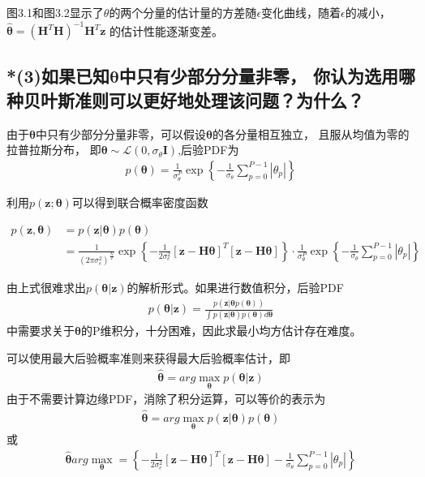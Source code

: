 \documentclass[fontset=windows]{article}
\numberwithin{figure}{section}
\begin{document}
图3.1和图3.2显示了\(\theta\)的两个分量的估计量的方差随\(\epsilon\)变化曲线，随着\(\epsilon\)的减小，
\(\hat{\boldsymbol{\theta}}=(\mathbf{H}^T \mathbf{H})^{-1}\mathbf{H}^T\mathbf{z}\)
的估计性能逐渐变差。

\subsection*{*(3)如果已知\(\boldsymbol{\theta}\)中只有少部分分量非零，
	你认为选用哪种贝叶斯准则可以更好地处理该问题？为什么？}

由于\(\boldsymbol{\theta}\)中只有少部分分量非零，可以假设\(\boldsymbol{\theta}\)的各分量相互独立，
且服从均值为零的拉普拉斯分布，
即\(\boldsymbol{\theta} \sim \mathcal{L}(0,\sigma_{\theta}\mathbf{I})\),后验PDF为
\begin{align*}
	p(\boldsymbol{\theta})=\frac{1}{\sigma_{\theta}^P}
	\exp\left\{-\frac{1}{\sigma_{\theta}}\sum_{p=0}^{P-1}|\theta_p| \right\}
\end{align*}

利用\(p(\mathbf{z};\boldsymbol{\theta})\)可以得到联合概率密度函数

\begin{align*}
	p(\mathbf{z},\boldsymbol{\theta})
	 & =p(\mathbf{z}|\boldsymbol{\theta})p(\boldsymbol{\theta}) \\
	 & =\frac{1}{(2\pi \sigma_e^2)^{\frac{N}{2}}}
	\exp\left\{-\frac{1}{2\sigma_e^2} \left[\mathbf{z-H}\boldsymbol{\theta}\right]^T
	\left[\mathbf{z-H}\boldsymbol{\theta}\right]\right\}\cdot \frac{1}{\sigma_{\theta}^P}
	\exp\left\{-\frac{1}{\sigma_{\theta}}\sum_{p=0}^{P-1}|\theta_p| \right\}
\end{align*}

由上式很难求出\(p(\boldsymbol{\theta}|\mathbf{z})\)的解析形式。如果进行数值积分，后验PDF
\begin{align*}
	p(\boldsymbol{\theta}|\mathbf{z})=\frac{p(\mathbf{z}|\boldsymbol{\theta}p(\boldsymbol{\theta}))}
	{\int p(\mathbf{z|\boldsymbol{\theta}})p(\boldsymbol{\theta})d\boldsymbol{\theta}}
\end{align*}
中需要求关于\(\boldsymbol{\theta}\)的P维积分，十分困难，因此求最小均方估计存在难度。

可以使用最大后验概率准则来获得最大后验概率估计，即
\begin{align*}
	\hat{\boldsymbol{\theta}}=arg \underset{\boldsymbol{\theta}}{\max}
	p(\boldsymbol{\theta |\mathbf{z}})
\end{align*}
由于不需要计算边缘PDF，消除了积分运算，可以等价的表示为
\begin{align*}
	\hat{\boldsymbol{\theta}}=arg \underset{\boldsymbol{\theta}}{\max}p(\mathbf{z}|\boldsymbol{\theta })
	p(\boldsymbol{\theta})
\end{align*}
或
\begin{align*}
	\hat{\boldsymbol{\theta}}arg \underset{\boldsymbol{\theta}}{\max}=
	\left\{-\frac{1}{2\sigma_e^2} \left[\mathbf{z-H}\boldsymbol{\theta}\right]^T
	\left[\mathbf{z-H}\boldsymbol{\theta}\right]
	-\frac{1}{\sigma_{\theta}}\sum_{p=0}^{P-1}|\theta_p|\right\}
\end{align*}
\end{document}

